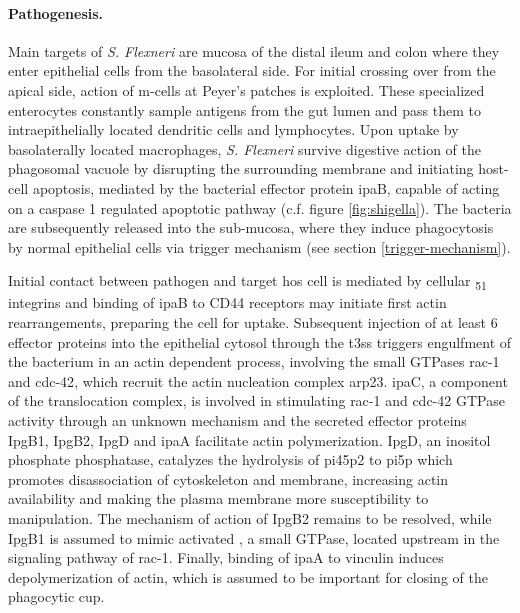 \paragraph{Pathogenesis.}
Main targets of \textit{S. Flexneri} are mucosa of the distal ileum and colon where they enter epithelial cells from the basolateral side. For initial crossing over from the apical side, action of \gls{m-cells} at Peyer's patches is exploited. These specialized enterocytes constantly sample antigens from the gut lumen and pass them to intraepithelially located dendritic cells and lymphocytes. Upon uptake by basolaterally located macrophages, \textit{S. Flexneri} survive digestive action of the phagosomal vacuole by disrupting the surrounding membrane and initiating host-cell apoptosis, mediated by the bacterial effector protein \acrshort{ipa}B, capable of acting on a caspase 1 regulated apoptotic pathway (c.f. figure \ref{fig:shigella}). The bacteria are subsequently released into the sub-mucosa, where they induce phagocytosis by normal epithelial cells via trigger mechanism (see section \ref{trigger-mechanism}).

Initial contact between pathogen and target hos cell is mediated by cellular \textalpha\textsubscript{5}\textbeta\textsubscript{1} integrins and binding of \acrshort{ipa}B to CD44 receptors may initiate first actin rearrangements, preparing the cell for uptake. Subsequent injection of at least 6 effector proteins into the epithelial cytosol through the \gls{t3ss} triggers engulfment of the bacterium in an actin dependent process, involving the small GTPases \gls{rac-1} and \gls{cdc-42}, which recruit the actin nucleation complex \gls{arp23}. \Acrshort{ipa}C, a component of the translocation complex, is involved in stimulating \gls{rac-1} and \gls{cdc-42} GTPase activity through an unknown mechanism and the secreted effector proteins IpgB1, IpgB2, IpgD and \acrshort{ipa}A facilitate actin polymerization. IpgD, an inositol phosphate phosphatase, catalyzes the hydrolysis of \acrshort{pi45p2} to \acrshort{pi5p} which promotes disassociation of cytoskeleton and membrane, increasing actin availability and making the plasma membrane more susceptibility to manipulation. The mechanism of action of IpgB2 remains to be resolved, while IpgB1 is assumed to mimic activated , a small GTPase, located upstream in the signaling pathway of \gls{rac-1}. Finally, binding of \acrshort{ipa}A to vinculin induces depolymerization of actin, which is assumed to be important for closing of the phagocytic cup.

